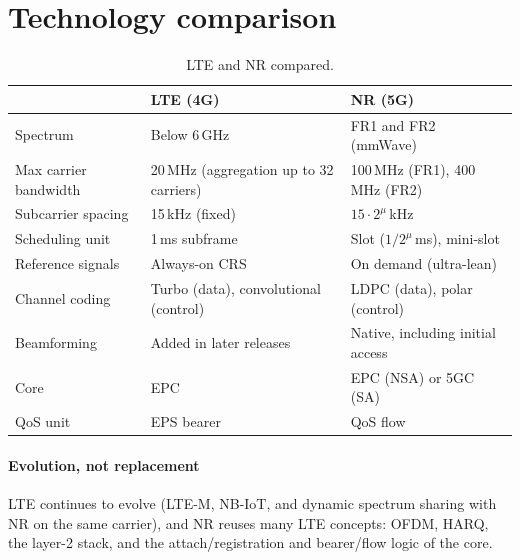 \documentclass[11pt,a4paper]{article}
\begin{document}
\section{Technology comparison}
\begin{table}[htbp]
\centering\small
\caption{LTE and NR compared.}\label{tab:cmp}
\begin{tabularx}{\linewidth}{@{}l Y Y@{}}
\toprule
{} & LTE (4G) & NR (5G) \\
\midrule
Spectrum          & Below 6\,GHz             & FR1 and FR2 (mmWave) \\
Max carrier bandwidth & 20\,MHz (aggregation up to 32 carriers) & 100\,MHz (FR1), 400\,MHz (FR2) \\
Subcarrier spacing & 15\,kHz (fixed)          & $15\cdot2^\mu$\,kHz \\
Scheduling unit   & 1\,ms subframe           & Slot ($1/2^\mu$\,ms), mini-slot \\
Reference signals & Always-on CRS            & On demand (ultra-lean) \\
Channel coding    & Turbo (data), convolutional (control) & LDPC (data), polar (control) \\
Beamforming       & Added in later releases  & Native, including initial access \\
Core              & EPC                      & EPC (NSA) or 5GC (SA) \\
QoS unit          & EPS bearer               & QoS flow \\
\bottomrule
\end{tabularx}
\end{table}

\paragraph{Evolution, not replacement} LTE continues to evolve (LTE-M, NB-IoT, and dynamic spectrum sharing with
NR on the same carrier), and NR reuses many LTE concepts: OFDM, HARQ, the layer-2 stack, and the
attach/registration and bearer/flow logic of the core.

\end{document}
